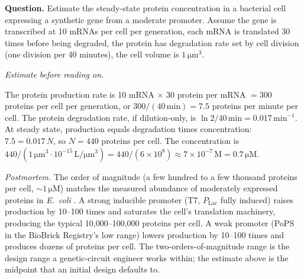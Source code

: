 \begin{estimation}
\textbf{Question.} Estimate the steady-state protein concentration
in a bacterial cell expressing a synthetic gene from a moderate
promoter. Assume the gene is transcribed at 10 mRNAs per cell per
generation, each mRNA is translated 30 times before being degraded,
the protein has degradation rate set by cell division (one division
per 40 minutes), the cell volume is $1\,\si{\micro\meter}^3$.

\smallskip
\textit{Estimate before reading on.}

\smallskip
The protein production rate is 10 mRNA $\times$ 30 protein per mRNA
$= 300$ proteins per cell per generation, or
$300/(40\,\text{min}) = 7.5$ proteins per minute per cell. The
protein degradation rate, if dilution-only, is $\ln 2/40\,\text{min}
= 0.017\,\text{min}^{-1}$. At steady state, production equals
degradation times concentration: $7.5 = 0.017\,N$, so $N = 440$
proteins per cell. The concentration is $440 / (1\,\si{\micro\meter}^3
\cdot 10^{-15}\,\text{L}/\si{\micro\meter}^3) = 440/(6 \times 10^{8})
\approx 7 \times 10^{-7}\,\text{M} = 0.7\,\si{\micro\text{M}}$.

\smallskip
\textit{Postmortem.} The order of magnitude (a few hundred to a few
thousand proteins per cell, $\sim 1\,\si{\micro\text{M}}$) matches
the measured abundance of moderately expressed proteins in
\emph{E.\ coli} \cite[ch.~2]{text:phillips-physical-biology}. A
strong inducible promoter (T7, $P_{\text{Lac}}$ fully induced) raises
production by 10--100 times and saturates the cell's translation
machinery, producing the typical 10{,}000--100{,}000 proteins per
cell. A weak promoter (PoPS in the BioBrick Registry's low range)
lowers production by 10--100 times and produces dozens of proteins
per cell. The two-orders-of-magnitude range is the design range a
genetic-circuit engineer works within; the estimate above is the
midpoint that an initial design defaults to.
\end{estimation}

